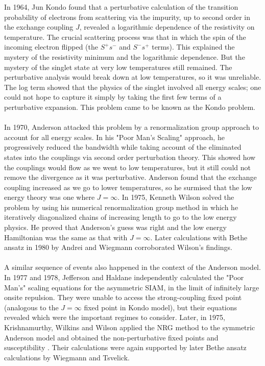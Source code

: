 \documentclass[twoside,11pt]{report}
\numberwithin{equation}{section}
\begin{document}
In 1964, Jun Kondo\cite{Kondo} found that a perturbative calculation of the transition probability of electrons from scattering via the impurity, up to second order in the exchange coupling \(J\), revealed a logarithmic dependence of the resistivity on temperature.
The crucial scattering process was that in which the spin of the incoming electron flipped (the \(S^+ s^-\) and \(S^- s^+\) terms).
This explained the mystery of the resistivity minimum and the logarithmic dependence.
But the mystery of the singlet state at very low temperatures still remained.
The perturbative analysis would break down at low temperatures, so it was unreliable.
The log term showed that the physics of the singlet involved all energy scales; one could not hope to capture it simply by taking the first few terms of a perturbative expansion.
This problem came to be known as the Kondo problem.
\\\\ In 1970, Anderson attacked this problem by a renormalization group approach to account for all energy scales.
In his "Poor Man's Scaling" approach, he progressively reduced the bandwidth while taking account of the eliminated states into the couplings via second order perturbation theory.
This showed how the couplings would flow as we went to low temperatures, but it still could not remove the divergence as it was perturbative.
Anderson found that the exchange coupling increased as we go to lower temperatures, so he surmised that the low energy theory was one where \(J=\infty\).
In 1975, Kenneth Wilson solved the problem by using his numerical renormalization group method in which he iteratively diagonalized chains of increasing length to go to the low energy physics.
He proved that Anderson's guess was right and the low energy Hamiltonian was the same as that with \(J=\infty\).
Later calculations with Bethe ansatz in 1980 by Andrei and Wiegmann \cite{andrei_kondo,wiegmann} corroborated Wilson's findings.
\\\\ A similar sequence of events also happened in the context of the Anderson model. In 1977 and 1978, Jefferson and Haldane independently calculated the "Poor Man's" scaling equations for the asymmetric SIAM, in the limit of infinitely large onsite repulsion. They were unable to access the strong-coupling fixed point (analogous to the \(J=\infty\) fixed point in Kondo model), but their equations revealed which were the important regimes to consider. Later, in 1975, Krishnamurthy, Wilkins and Wilson applied the NRG method to the symmetric Anderson model and obtained the non-perturbative fixed points and susceptibility \cite{hrk-nrg}. Their calculations were again supported by later Bethe ansatz calculations by Wiegmann and Tsvelick\cite{Tsvelick}.
\end{document}
